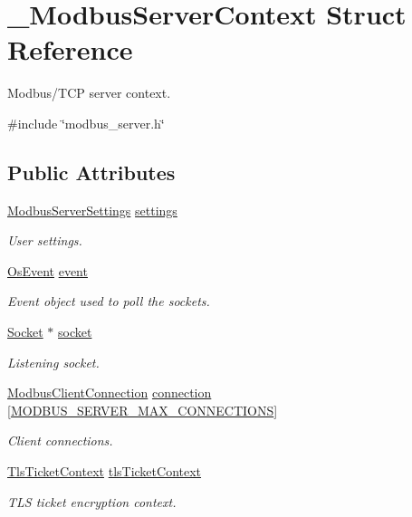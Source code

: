 \hypertarget{struct__ModbusServerContext}{}\section{\+\_\+\+Modbus\+Server\+Context Struct Reference}
\label{struct__ModbusServerContext}


Modbus/\+T\+CP server context.  




{\ttfamily \#include \char`\"{}modbus\+\_\+server.\+h\char`\"{}}

\subsection*{Public Attributes}
\begin{DoxyCompactItemize}
\item 
\hyperlink{structModbusServerSettings}{Modbus\+Server\+Settings} \hyperlink{struct__ModbusServerContext_af265a1c5ec83119040b5cd7e0f59dfe0}{settings}
\begin{DoxyCompactList}\small\item\em User settings. \end{DoxyCompactList}\item 
\hyperlink{structOsEvent}{Os\+Event} \hyperlink{struct__ModbusServerContext_a1816bb4adf2b82bdc288e034d16f242a}{event}
\begin{DoxyCompactList}\small\item\em Event object used to poll the sockets. \end{DoxyCompactList}\item 
\hyperlink{socket_8h_aa85acfb0fa336ef495e6ba87fb88fc48}{Socket} $\ast$ \hyperlink{struct__ModbusServerContext_a1e2a3f982100450ef100b724c3f5177d}{socket}
\begin{DoxyCompactList}\small\item\em Listening socket. \end{DoxyCompactList}\item 
\hyperlink{modbus__server_8h_a9bb52dfbcf1ed2f018736b720a3b0748}{Modbus\+Client\+Connection} \hyperlink{struct__ModbusServerContext_ab70c1f99b43abbef982d8bd01d55a278}{connection} \mbox{[}\hyperlink{modbus__server_8h_ae256368c84a889cda6e1e67109c23ee6}{M\+O\+D\+B\+U\+S\+\_\+\+S\+E\+R\+V\+E\+R\+\_\+\+M\+A\+X\+\_\+\+C\+O\+N\+N\+E\+C\+T\+I\+O\+NS}\mbox{]}
\begin{DoxyCompactList}\small\item\em Client connections. \end{DoxyCompactList}\item 
\hyperlink{structTlsTicketContext}{Tls\+Ticket\+Context} \hyperlink{struct__ModbusServerContext_ae28db16e3bab0eb21544a24957bf7ee5}{tls\+Ticket\+Context}
\begin{DoxyCompactList}\small\item\em T\+LS ticket encryption context. \end{DoxyCompactList}\end{DoxyCompactItemize}


